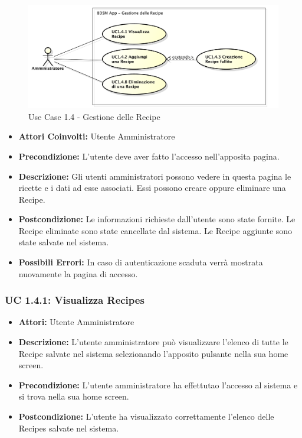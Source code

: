 \begin{figure}[!ht]
    \centering
    \centerline{\includegraphics[scale=0.5]{./images/UC1_4.pdf}}
    \caption{Use Case 1.4 - Gestione delle Recipe}
\end{figure}

\begin{itemize}
    \item \textbf{Attori Coinvolti:} Utente Amministratore

    \item \textbf{Precondizione:} L'utente deve aver fatto l'accesso nell'apposita pagina.

    \item \textbf{Descrizione:} Gli utenti amministratori possono vedere in questa pagina le ricette e i dati ad esse associati. Essi possono creare oppure eliminare una Recipe.

    \item \textbf{Postcondizione:} Le informazioni richieste dall'utente sono state fornite.
    Le Recipe eliminate sono state cancellate dal sistema.
    Le Recipe aggiunte sono state salvate nel sistema.

    \item \textbf{Possibili Errori:} In caso di autenticazione scaduta verrà mostrata nuovamente la pagina di accesso.
\end{itemize}

\subsubsection{UC 1.4.1: Visualizza Recipes}

\begin{itemize}
    \item \textbf{Attori:} Utente Amministratore
    \item \textbf{Descrizione:} L'utente amministratore può visualizzare l'elenco di tutte le Recipe salvate nel sistema selezionando l'apposito pulsante nella sua home screen.
    \item \textbf{Precondizione:} L'utente amministratore ha effettutao l'accesso al sistema e si trova nella sua home screen.
    \item \textbf{Postcondizione:} L'utente ha visualizzato correttamente l'elenco delle Recipes salvate nel sistema.
\end{itemize}

